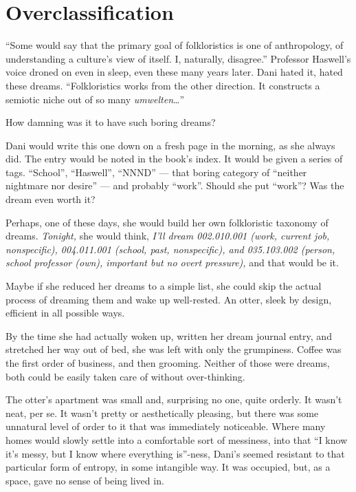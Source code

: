 \hypertarget{overclassification}{%
\chapter{Overclassification}\label{overclassification}}

``Some would say that the primary goal of folkloristics is one of anthropology, of understanding a culture's view of itself. I, naturally, disagree.'' Professor Haswell's voice droned on even in sleep, even these many years later. Dani hated it, hated these dreams. ``Folkloristics works from the other direction. It constructs a semiotic niche out of so many \emph{umwelten}\ldots{}''

How damning was it to have such boring dreams?

Dani would write this one down on a fresh page in the morning, as she always did. The entry would be noted in the book's index. It would be given a series of tags. ``School'', ``Haswell'', ``NNND'' --- that boring category of ``neither nightmare nor desire'' --- and probably ``work''. Should she put ``work''? Was the dream even worth it?

Perhaps, one of these days, she would build her own folkloristic taxonomy of dreams. \emph{Tonight,} she would think, \emph{I'll dream 002.010.001 (work, current job, nonspecific), 004.011.001 (school, past, nonspecific), and 035.103.002 (person, school professor (own), important but no overt pressure),} and that would be it.

Maybe if she reduced her dreams to a simple list, she could skip the actual process of dreaming them and wake up well-rested. An otter, sleek by design, efficient in all possible ways.

By the time she had actually woken up, written her dream journal entry, and stretched her way out of bed, she was left with only the grumpiness. Coffee was the first order of business, and then grooming. Neither of those were dreams, both could be easily taken care of without over-thinking.

The otter's apartment was small and, surprising no one, quite orderly. It wasn't neat, per se. It wasn't pretty or aesthetically pleasing, but there was some unnatural level of order to it that was immediately noticeable. Where many homes would slowly settle into a comfortable sort of messiness, into that ``I know it's messy, but I know where everything is''-ness, Dani's seemed resistant to that particular form of entropy, in some intangible way. It was occupied, but, as a space, gave no sense of being lived in.

